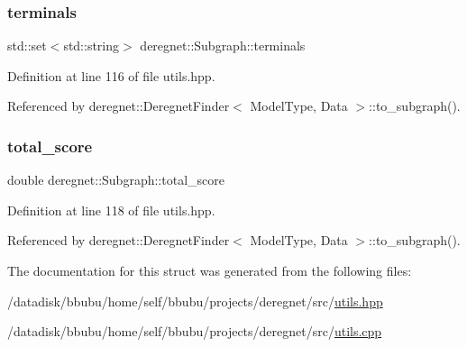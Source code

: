 \subsubsection{\texorpdfstring{terminals}{terminals}}
{\footnotesize\ttfamily std\+::set$<$std\+::string$>$ deregnet\+::\+Subgraph\+::terminals}



Definition at line 116 of file utils.\+hpp.



Referenced by deregnet\+::\+Deregnet\+Finder$<$ Model\+Type, Data $>$\+::to\+\_\+subgraph().

\mbox{\label{structderegnet_1_1Subgraph_a3fdd10c0e803822ae09a71e5b549e471}} 
\subsubsection{\texorpdfstring{total\+\_\+score}{total\_score}}
{\footnotesize\ttfamily double deregnet\+::\+Subgraph\+::total\+\_\+score}



Definition at line 118 of file utils.\+hpp.



Referenced by deregnet\+::\+Deregnet\+Finder$<$ Model\+Type, Data $>$\+::to\+\_\+subgraph().



The documentation for this struct was generated from the following files\+:\begin{DoxyCompactItemize}
\item 
/datadisk/bbubu/home/self/bbubu/projects/deregnet/src/\hyperlink{utils_8hpp}{utils.\+hpp}\item 
/datadisk/bbubu/home/self/bbubu/projects/deregnet/src/\hyperlink{utils_8cpp}{utils.\+cpp}\end{DoxyCompactItemize}
